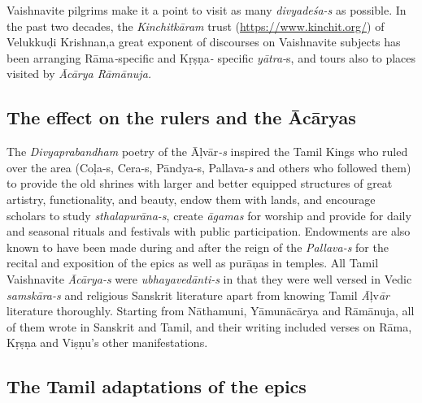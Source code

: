  \item Vaishnavite pilgrims make it a point to visit as many \textit{divyadeśa-s} as possible. In the past two decades, the \textit{Kinchitkāram} trust (\url{https://www.kinchit.org/}) of Velukkuḍi Krishnan,a great exponent of discourses on Vaishnavite subjects has been arranging Rāma\textit{-}specific and Kṛṣṇa\textit{-} specific \textit{yātra-}s, and tours also to places visited by \textit{Ācārya Rāmānuja.}



\subsection{The effect on the rulers and the Ācāryas}

\item The \textit{Divyaprabandham} poetry of the Āļvār\textit{-s} inspired the Tamil Kings who ruled over the area (Coļa-s, Cera-s, Pāndya-s, Pallava-\textit{s} and others who followed them) to provide the old shrines with larger and better equipped structures of great artistry, functionality, and beauty, endow them with lands, and encourage scholars to study \textit{sthalapurāna-s}, create \textit{āgamas} for worship and provide for daily and seasonal rituals and festivals with public participation. Endowments are also known to have been made during and after the reign of the \textit{Pallava-s} for the recital and exposition of the epics as well as purāņas in temples. All Tamil Vaishnavite \textit{Ācārya-s} were \textit{ubhayavedānti-s} in that they were well versed in Vedic \textit{samskāra-s} and religious Sanskrit literature apart from knowing Tamil \textit{Ā}ļv\textit{ār} literature thoroughly. Starting from Nāthamuni, Yāmunācārya and Rāmānuja, all of them wrote in Sanskrit and Tamil, and their writing included verses on Rāma, Kṛṣṇa and Viṣṇu’s other manifestations.



\subsection{The Tamil adaptations of the epics}

